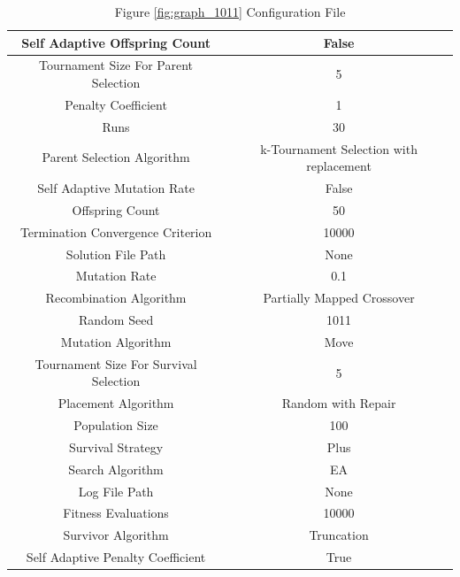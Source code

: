 \documentclass{standalone}
\begin{document}
\clearpage
\begin{table}[!htb]
	\centering
	\caption{Figure \ref{fig:graph_1011} Configuration File}
	\label{tab:graph_1011}
	\begin{tabular}{| c | c |}
		\hline
		Self Adaptive Offspring Count		& False		 \\
		\hline
		Tournament Size For Parent Selection		& 5		 \\
		\hline
		Penalty Coefficient		& 1		 \\
		\hline
		Runs		& 30		 \\
		\hline
		Parent Selection Algorithm		& k-Tournament Selection with replacement		 \\
		\hline
		Self Adaptive Mutation Rate		& False		 \\
		\hline
		Offspring Count		& 50		 \\
		\hline
		Termination Convergence Criterion		& 10000		 \\
		\hline
		Solution File Path		& None		 \\
		\hline
		Mutation Rate		& 0.1		 \\
		\hline
		Recombination Algorithm		& Partially Mapped Crossover		 \\
		\hline
		Random Seed		& 1011		 \\
		\hline
		Mutation Algorithm		& Move		 \\
		\hline
		Tournament Size For Survival Selection		& 5		 \\
		\hline
		Placement Algorithm		& Random with Repair		 \\
		\hline
		Population Size		& 100		 \\
		\hline
		Survival Strategy		& Plus		 \\
		\hline
		Search Algorithm		& EA		 \\
		\hline
		Log File Path		& None		 \\
		\hline
		Fitness Evaluations		& 10000		 \\
		\hline
		Survivor Algorithm		& Truncation		 \\
		\hline
		Self Adaptive Penalty Coefficient		& True		 \\
		\hline
	\end{tabular}
\end{table}
\end{document}
